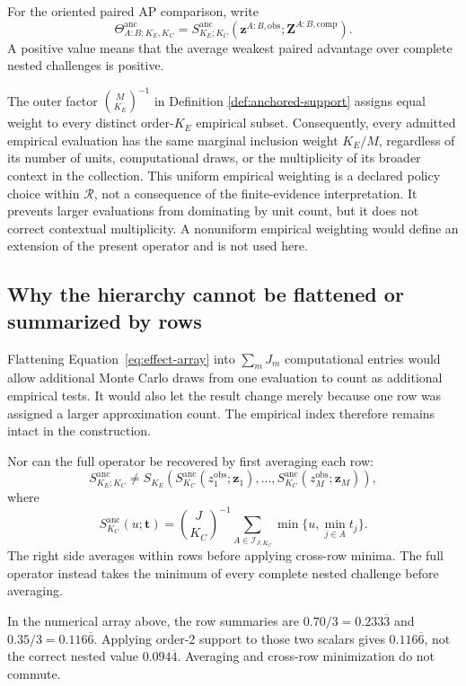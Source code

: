 \documentclass[11pt]{article}
\newcommand{\Regime}{\mathcal{R}}
\newcommand{\Sanc}{S^{\mathrm{anc}}}
\newcommand{\Thetaanc}{\Theta^{\mathrm{anc}}}
\theoremstyle{remark}
\begin{document}
For the oriented paired AP comparison, write
\begin{equation}
\Thetaanc_{A:B;K_E,K_C}
=
\Sanc_{K_E;K_C}
\left(
\mathbf z^{A:B,\mathrm{obs}};
\mathbf Z^{A:B,\mathrm{comp}}
\right).
\label{eq:anchored-paired-support}
\end{equation}
A positive value means that the average weakest paired advantage over complete
nested challenges is positive.

The outer factor $\binom{M}{K_E}^{-1}$ in Definition
\ref{def:anchored-support} assigns equal weight to every distinct order-$K_E$
empirical subset. Consequently, every admitted empirical evaluation has the
same marginal inclusion weight $K_E/M$, regardless of its number of units,
computational draws, or the multiplicity of its broader context in the
collection. This uniform empirical weighting is a declared policy choice
within $\Regime$, not a consequence of the finite-evidence interpretation. It
prevents larger evaluations from dominating by unit count, but it does not
correct contextual multiplicity. A nonuniform empirical weighting would define
an extension of the present operator and is not used here.

\subsection{Why the hierarchy cannot be flattened or summarized by rows}

Flattening Equation~\eqref{eq:effect-array} into $\sum_mJ_m$ computational
entries would allow additional Monte Carlo draws from one evaluation to count
as additional empirical tests. It would also let the result change merely
because one row was assigned a larger approximation count. The empirical
index therefore remains intact in the construction.

Nor can the full operator be recovered by first averaging each row:
\begin{equation}
\Sanc_{K_E;K_C}
\ne
S_{K_E}\!\left(
\Sanc_{K_C}(z_1^{\mathrm{obs}};\mathbf z_1),
\ldots,
\Sanc_{K_C}(z_M^{\mathrm{obs}};\mathbf z_M)
\right),
\label{eq:row-noncomposition}
\end{equation}
where
\[
\Sanc_{K_C}(u;\mathbf t)
=
\binom{J}{K_C}^{-1}
\sum_{A\in\mathcal I_{J,K_C}}
\min\{u,\min_{j\in A}t_j\}.
\]
The right side averages within rows before applying cross-row minima. The full
operator instead takes the minimum of every complete nested challenge before
averaging.

In the numerical array above, the row summaries are
$0.70/3=0.233\overline3$ and $0.35/3=0.116\overline6$. Applying order-2
support to those two scalars gives $0.116\overline6$, not the correct nested
value $0.094\overline4$. Averaging and cross-row minimization do not commute.
\end{document}
